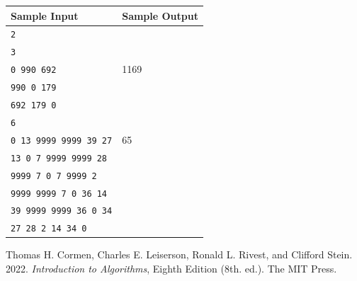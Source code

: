 \documentclass[a4paper]{exam}
\begin{document}
\begin{questions}
	\begin{table}[]
		\centering
		\begin{tabular}{|l|l|}
			\hline
			Sample Input                  & Sample Output \\ \hline
			\texttt{2}                    &               \\ \hline
			\texttt{3}                    &               \\
			\texttt{0  990 692}           & 1169          \\
			\texttt{990  0 179}           &               \\
			\texttt{692  179 0}           &               \\
			\texttt{6}                    &               \\ \hline
			\texttt{0 13 9999 9999 39 27} & 65            \\
			\texttt{13 0 7 9999 9999 28}  &               \\
			\texttt{9999 7 0 7 9999 2}    &               \\
			\texttt{9999 9999 7 0 36 14}  &               \\
			\texttt{39 9999 9999 36 0 34} &               \\
			\texttt{27 28 2 14 34 0}      &               \\ \hline
		\end{tabular}
	\end{table}

	\begin{thebibliography}{9}
		Thomas H. Cormen, Charles E. Leiserson, Ronald L. Rivest, and Clifford Stein. 2022. \textit{Introduction to Algorithms}, Eighth Edition (8th. ed.). The MIT Press.
	\end{thebibliography}


\end{questions}
\end{document}
